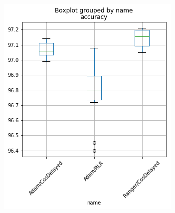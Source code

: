 \begin{figure}[ht]
    \hspace*{-0.05\linewidth}
    \begin{minipage}[c]{0.55\linewidth}
        \includegraphics[width=1\linewidth]{results/lemmatisation/entrainement/boxplot_accuracy_ranger.png}
    \end{minipage} \hfill
    \begin{minipage}[c]{0.55\linewidth}

\end{minipage}
\end{figure}
